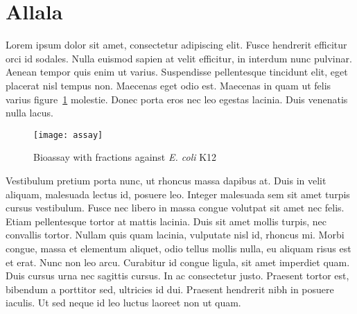
\section{Allala} %
\label{sec:allala}


Lorem ipsum dolor sit amet, consectetur adipiscing elit. Fusce hendrerit efficitur orci id sodales. Nulla euismod sapien at velit efficitur, in interdum nunc pulvinar. Aenean tempor quis enim ut varius. Suspendisse pellentesque tincidunt elit, eget placerat nisl tempus non. Maecenas eget odio est. Maecenas in quam  ut felis varius figure~\ref{fig:assay} molestie. Donec porta eros nec leo egestas lacinia. Duis venenatis nulla lacus.

\begin{figure}[h]
	\centering
	\texttt{[image: assay]}
	\caption{Bioassay with fractions against \emph{E. coli} K12}
	\label{fig:assay}
\end{figure}

Vestibulum pretium porta nunc, ut rhoncus massa dapibus at. Duis in velit aliquam, malesuada lectus id, posuere leo. Integer malesuada sem sit amet turpis cursus vestibulum. Fusce nec libero in massa congue volutpat sit amet nec felis. Etiam pellentesque tortor at mattis lacinia. Duis sit amet mollis turpis, nec convallis tortor. Nullam quis quam lacinia, vulputate nisl id, rhoncus mi. Morbi congue, massa et elementum aliquet, odio tellus mollis nulla, eu aliquam risus est et erat. Nunc non leo arcu. Curabitur id congue ligula, sit amet imperdiet quam. Duis cursus urna nec sagittis cursus. In ac consectetur justo. Praesent tortor est, bibendum a porttitor sed, ultricies id dui. Praesent hendrerit nibh in posuere iaculis. Ut sed neque id leo luctus laoreet non ut quam.

